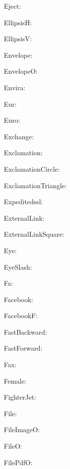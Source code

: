 \documentclass{article}
\begin{document}
      Eject: \faEject\ 

      EllipsisH: \faEllipsisH\ 

      EllipsisV: \faEllipsisV\ 

      Envelope: \faEnvelope\ 

      EnvelopeO: \faEnvelopeO\ 

      Envira: \faEnvira\ 

      Eur: \faEur\ 

      Euro: \faEuro\ 

      Exchange: \faExchange\ 

      Exclamation: \faExclamation\ 

      ExclamationCircle: \faExclamationCircle\ 

      ExclamationTriangle: \faExclamationTriangle\ 

      Expeditedssl: \faExpeditedssl\ 

      ExternalLink: \faExternalLink\ 

      ExternalLinkSquare: \faExternalLinkSquare\ 

      Eye: \faEye\ 

      EyeSlash: \faEyeSlash\ 

      Fa: \faFa\ 

      Facebook: \faFacebook\ 

      FacebookF: \faFacebookF\ 

      FastBackward: \faFastBackward\ 

      FastForward: \faFastForward\ 

      Fax: \faFax\ 

      Female: \faFemale\ 

      FighterJet: \faFighterJet\ 

      File: \faFile\ 

      FileImageO: \faFileImageO\ 

      FileO: \faFileO\ 

      FilePdfO: \faFilePdfO\ 
\end{document}
